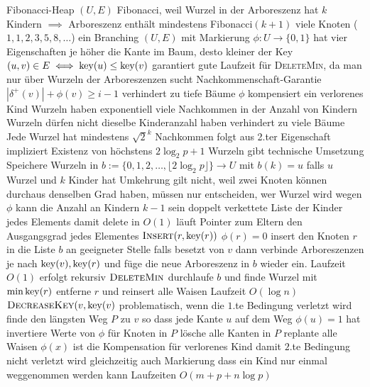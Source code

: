 \begin{outline}
    \1 Fibonacci-Heap $(U, E)$
        \2 Fibonacci, weil Wurzel in der Arboreszenz hat $k$ Kindern $\implies$ Arboreszenz enthält mindestens Fibonacci$(k+1)$ viele Knoten ($1,1,2,3,5,8,\ldots$)
        \2 ein Branching $(U,E)$ mit Markierung $\phi: U \rightarrow\{0,1\}$ 
        \2 hat vier Eigenschaften
            \3 je höher die Kante im Baum, desto kleiner der Key
                \4 $(u,v)\in E \iff \operatorname{key}(u) \leq \operatorname{key}(v)$
                \4 garantiert gute Laufzeit für \textsc{DeleteMin}, da man nur über Wurzeln der Arboreszenzen sucht
            \3 Nachkommenschaft-Garantie 
                \4 $|\delta^+(v)|+\phi(v) \geq i-1$
                \4 verhindert zu tiefe Bäume
                \4 $\phi$ kompensiert ein verlorenes Kind 
                \4 Wurzeln haben exponentiell viele Nachkommen in der Anzahl von Kindern
            \3 Wurzeln dürfen nicht dieselbe Kinderanzahl haben    
                \4 verhindert zu viele Bäume
            \3 Jede Wurzel hat mindestens $\sqrt{2}^k$ Nachkommen
                \4 folgt aus 2.ter Eigenschaft
                \4 impliziert Existenz von höchstens $2\log_2 p +1$ Wurzeln gibt
        \2 technische Umsetzung
            \3 Speichere Wurzeln in $b:=\{0,1,2, \ldots, \lfloor 2\log_2 p\rfloor\}\rightarrow U$ mit $b(k)=u$ falls $u$ Wurzel und $k$ Kinder hat 
                \4 Umkehrung gilt nicht, weil zwei Knoten können durchaus denselben Grad haben, müssen nur entscheiden, wer Wurzel wird
                \4 wegen $\phi$ kann die Anzahl an Kindern $k-1$ sein
            \3 doppelt verkettete Liste der Kinder jedes Elements 
                \4 damit delete in $O(1)$ läuft
            \3 Pointer zum Eltern
            \3 den Ausgangsgrad jedes Elementes
        \2 $\textsc{Insert}(r, \operatorname{key}(r))$
            \3 $\phi(r) = 0$
            \3 insert den Knoten $r$ in die Liste $b$ an geeigneter Stelle
            \3 falls besetzt von $v$ dann verbinde Arboreszenzen je nach $\operatorname{key}(v), \operatorname{key}(r)$ und füge die neue Arboreszenz in $b$ wieder ein. 
            \3 Laufzeit $O(1)$
            \3 erfolgt rekursiv
        \2 $\textsc{DeleteMin}$
            \3 durchlaufe $b$ und finde Wurzel mit $\min \operatorname{key}(r)$
            \3 entferne $r$ und reinsert alle Waisen
            \3 Laufzeit $O(\log n)$
        \2 $\textsc{DecreaseKey}(v,\operatorname{key}(v)$
            \3 problematisch, wenn die $1$.te Bedingung verletzt wird
            \3 finde den längsten Weg $P$ zu $v$ so dass jede Kante $u$ auf dem Weg $\phi(u)=1$ hat
            \3 invertiere Werte von $\phi$ für Knoten in $P$
            \3 lösche alle Kanten in $P$
            \3 replante alle Waisen
            \3 $\phi(x)$ ist die Kompensation für verlorenes Kind damit $2$.te Bedingung nicht verletzt wird
            \3 gleichzeitig auch Markierung dass ein Kind nur einmal weggenommen werden kann 
        \2 Laufzeiten $O(m+p+n \log p)$ 
\end{outline}
